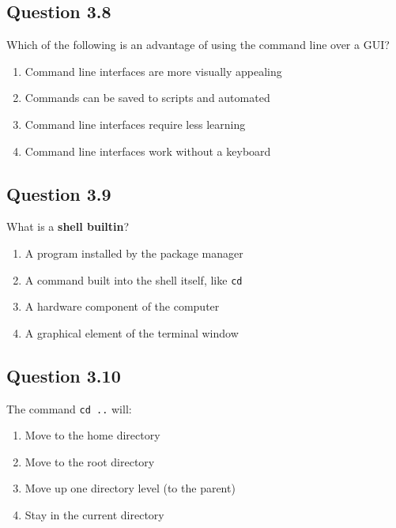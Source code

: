 \documentclass[
  letterpaper,
  DIV=11,
  numbers=noendperiod]{scrreprt}
\providecommand{\tightlist}{%
  \setlength{\itemsep}{0pt}\setlength{\parskip}{0pt}}
\begin{document}
\subsection{Question 3.8}\label{question-3.8}

Which of the following is an advantage of using the command line over a
GUI?

\begin{enumerate}
\def\labelenumi{\Alph{enumi})}
\tightlist
\item
  Command line interfaces are more visually appealing\\
\item
  Commands can be saved to scripts and automated\\
\item
  Command line interfaces require less learning\\
\item
  Command line interfaces work without a keyboard
\end{enumerate}

\subsection{Question 3.9}\label{question-3.9}

What is a \textbf{shell builtin}?

\begin{enumerate}
\def\labelenumi{\Alph{enumi})}
\tightlist
\item
  A program installed by the package manager\\
\item
  A command built into the shell itself, like \texttt{cd}\\
\item
  A hardware component of the computer\\
\item
  A graphical element of the terminal window
\end{enumerate}

\subsection{Question 3.10}\label{question-3.10}

The command \texttt{cd\ ..} will:

\begin{enumerate}
\def\labelenumi{\Alph{enumi})}
\tightlist
\item
  Move to the home directory\\
\item
  Move to the root directory\\
\item
  Move up one directory level (to the parent)\\
\item
  Stay in the current directory
\end{enumerate}
\end{document}
